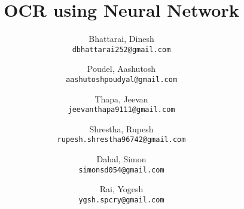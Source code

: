 \documentclass{report}
\title{OCR using Neural Network}
\author{
  Bhattarai, Dinesh\\
  \texttt{dbhattarai252@gmail.com}
  \and
  Poudel, Aashutosh\\
  \texttt{aashutoshpoudyal@gmail.com}
  \and
  Thapa, Jeevan\\
  \texttt{jeevanthapa9111@gmail.com}
  \and
  Shrestha, Rupesh\\
  \texttt{rupesh.shrestha96742@gmail.com}
  \and
  Dahal, Simon\\
  \texttt{simonsd054@gmail.com}
  \and
  Rai, Yogesh\\
  \texttt{ygsh.spcry@gmail.com}
}
\begin{document}
\begin{multicols}{2}
\maketitle
\end{multicols}
\end{document}
